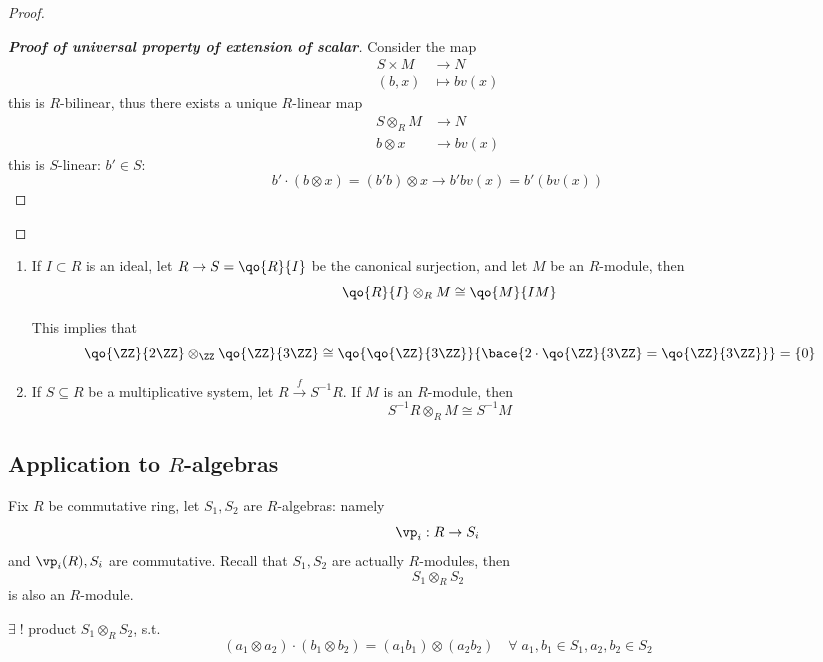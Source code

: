 \begin{eg}
\begin{proof}
		\begin{proof}[\textbf{Proof of universal property of extension of scalar}]
			Consider the map
			\[
				\begin{aligned}
					S \times M & \to N         \\
					(b,x)      & \mapsto bv(x)
				\end{aligned}
			\]
			this is \( R \)-bilinear, thus there exists a unique \( R \)-linear map
			\[
				\begin{aligned}
					S\otimes_R M & \to N      \\
					b\otimes x   & \to b v(x)
				\end{aligned}
			\]
			this is \( S \)-linear: \( b' \in S: \)
			\[
				b'\cdot (b\otimes x) = (b'b)\otimes x \to b'b v(x) = b'(bv(x))
			\]
		\end{proof}
	\end{proof}
\end{eg}

\begin{eg}
	\leavevmode
	\begin{enumerate}
		\item If \( I \subset R \) is an ideal, let \( R \to S = \qo{R}{I} \) be the canonical
		      surjection, and let \( M \) be an \( R \)-module, then
		      \[
			      \qo{R}{I} \otimes_R M \cong \qo{M}{IM}
		      \]
		      \begin{note}
			      This implies that
			      \[
				      \qo{\ZZ}{2\ZZ} \otimes_\ZZ \qo{\ZZ}{3\ZZ} \cong \qo{\qo{\ZZ}{3\ZZ}}{\bace{2\cdot \qo{\ZZ}{3\ZZ} = \qo{\ZZ}{3\ZZ}}}
				      = \{0\}
			      \]
		      \end{note}
		\item If \( S \subseteq R \) be a multiplicative system, let \( R \xrightarrow{f} S^{-1} R \). If \( M \)
		      is an \( R \)-module, then
		      \[
			      S^{-1}R \otimes_R M \cong S^{-1} M
		      \]
	\end{enumerate}
\end{eg}

\subsection{Application to \( R \)-algebras}
Fix \( R \) be commutative ring, let \( S_1, S_2 \) are \( R \)-algebras: namely
\[
	\vp_i : R \to S_i
\]
and \( \vp_i(R), S_i \) are commutative. Recall that \( S_1, S_2 \) are actually \( R \)-modules, then
\[
	S_1 \otimes_R S_2
\]
is also an \( R \)-module.
\begin{claim}
	\( \exists \; ! \) product \( S_1 \otimes_R S_2 \), s.t.
	\[
		(a_1\otimes a_2) \cdot (b_1\otimes b_2) = (a_1b_1) \otimes (a_2 b_2) \quad \forall \; a_1,b_1\in
		S_1, a_2,b_2 \in S_2
	\]
\end{claim}

